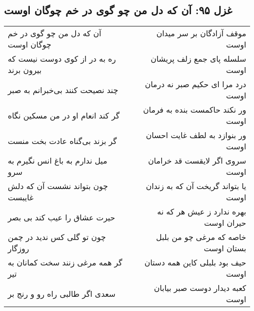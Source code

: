 \begin{center}
\section*{غزل ۹۵: آن که دل من چو گوی در خم چوگان اوست}
\label{sec:095}
\begin{longtable}{l p{0.5cm} r}
آن که دل من چو گوی در خم چوگان اوست
&&
موقف آزادگان بر سر میدان اوست
\\
ره به در از کوی دوست نیست که بیرون برند
&&
سلسله پای جمع زلف پریشان اوست
\\
چند نصیحت کنند بی‌خبرانم به صبر
&&
درد مرا ای حکیم صبر نه درمان اوست
\\
گر کند انعام او در من مسکین نگاه
&&
ور نکند حاکمست بنده به فرمان اوست
\\
گر بزند بی‌گناه عادت بخت منست
&&
ور بنوازد به لطف غایت احسان اوست
\\
میل ندارم به باغ انس نگیرم به سرو
&&
سروی اگر لایقست قد خرامان اوست
\\
چون بتواند نشست آن که دلش غایبست
&&
یا بتواند گریخت آن که به زندان اوست
\\
حیرت عشاق را عیب کند بی بصر
&&
بهره ندارد ز عیش هر که نه حیران اوست
\\
چون تو گلی کس ندید در چمن روزگار
&&
خاصه که مرغی چو من بلبل بستان اوست
\\
گر همه مرغی زنند سخت کمانان به تیر
&&
حیف بود بلبلی کاین همه دستان اوست
\\
سعدی اگر طالبی راه رو و رنج بر
&&
کعبه دیدار دوست صبر بیابان اوست
\\
\end{longtable}
\end{center}
